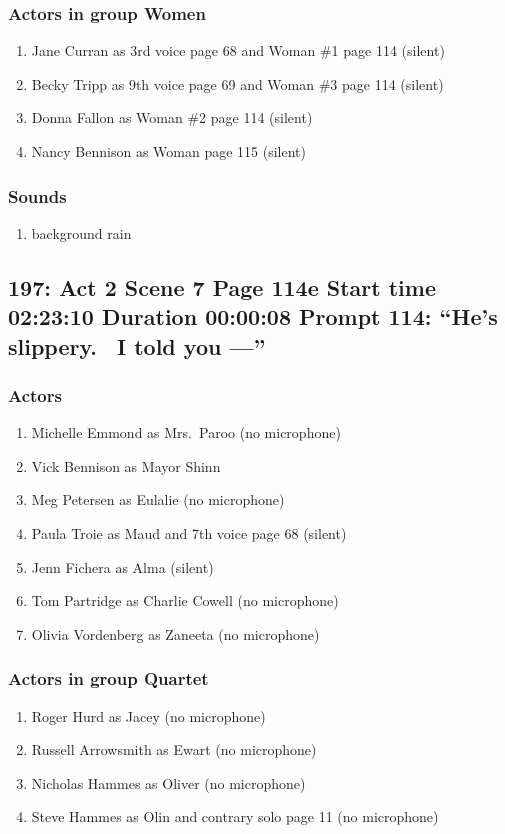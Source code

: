 \subsubsection{Actors in group Women}
\begin{enumerate}
\item Jane Curran as 3rd voice page 68 and Woman \#1 page 114 (silent)
\item Becky Tripp as 9th voice page 69 and Woman \#3 page 114 (silent)
\item Donna Fallon as Woman \#2 page 114 (silent)
\item Nancy Bennison as Woman page 115 (silent)
\end{enumerate}

\subsubsection{Sounds}
\begin{enumerate}
\item background rain
\end{enumerate}
\subsection{197: Act 2 Scene 7 Page 114e Start time 02:23:10 Duration 00:00:08 Prompt 114: ``He's slippery.~ I told you ---''}

\subsubsection{Actors}
\begin{enumerate}
\item Michelle Emmond as Mrs.~Paroo (no microphone)
\item Vick Bennison as Mayor Shinn
\item Meg Petersen as Eulalie (no microphone)
\item Paula Troie as Maud and 7th voice page 68 (silent)
\item Jenn Fichera as Alma (silent)
\item Tom Partridge as Charlie Cowell (no microphone)
\item Olivia Vordenberg as Zaneeta (no microphone)
\end{enumerate}
\subsubsection{Actors in group Quartet}
\begin{enumerate}
\item Roger Hurd as Jacey (no microphone)
\item Russell Arrowsmith as Ewart (no microphone)
\item Nicholas Hammes as Oliver (no microphone)
\item Steve Hammes as Olin and contrary solo page 11 (no microphone)
\end{enumerate}

